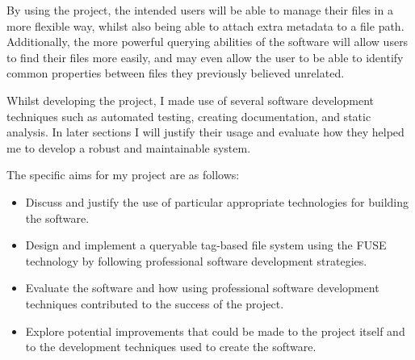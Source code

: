 By using the project, the intended users will be able to manage their files in
a more flexible way, whilst also being able to attach extra metadata to a file
path. Additionally, the more powerful querying abilities of the software will
allow users to find their files more easily, and may even allow the user to
be able to identify common properties between files they previously believed
unrelated.

Whilst developing the project, I made use of several software development
techniques such as automated testing, creating documentation, and static
analysis. In later sections I will justify their usage and evaluate how they
helped me to develop a robust and maintainable system.

\vspace{4mm}
The specific aims for my project are as follows:
\begin{itemize}
    \item Discuss and justify the use of particular appropriate technologies
        for building the software.
    \item Design and implement a queryable tag-based file system using the FUSE
        technology by following professional software development strategies.
    \item Evaluate the software and how using professional software development
        techniques contributed to the success of the project.
    \item Explore potential improvements that could be made to the project
        itself and to the development techniques used to create the software.
\end{itemize}
